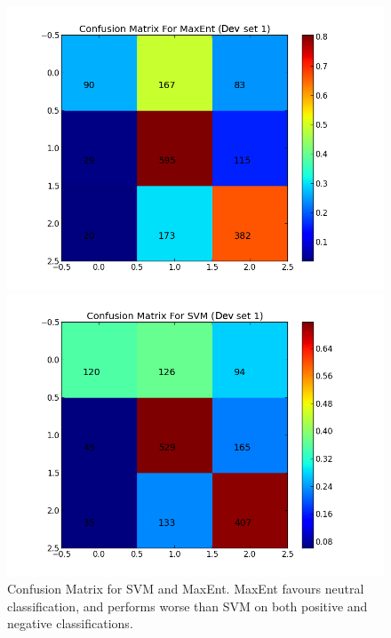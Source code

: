 \begin{figure}[!htb]
	\centering
	\begin{minipage}{.45\linewidth}
		\includegraphics[width=\linewidth]{../img/plots/analysis/maxent_confusion_matrix_best.png}
	\end{minipage}
	\hspace{0.05\linewidth}
	\begin{minipage}{.45\linewidth}
		\includegraphics[width=\linewidth]{../img/plots/analysis/svm_confusion_matrix_best.png}
	\end{minipage}
	\caption[Confusion Matrix for SVM and MaxEnt]{Confusion Matrix for SVM and MaxEnt. MaxEnt favours neutral classification, and performs worse than SVM on both positive and negative classifications.}
	\label{fig:best_result_confusion}
\end{figure}

